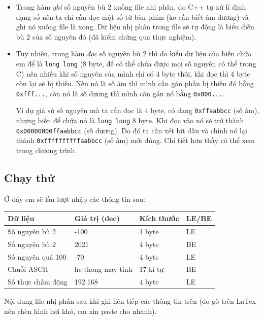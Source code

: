 \documentclass[12pt, final]{article}
\newcommand{\code}[1]{\texttt{#1}}
\begin{document}
\begin{itemize}
    \item Trong hàm \textit{ghi} số nguyên bù 2 xuống file nhị phân, do C++ tự xử lí định dạng số nên ta chỉ cần đọc một số từ bàn phím (ko cần biết âm dương) và ghi nó xuống file là xong. Dữ liệu nhị phân trong file sẽ tự động là biểu diễn bù 2 của số nguyên đó (đã kiểm chứng qua thực nghiệm).
    \item Tuy nhiên, trong hàm \textit{đọc} số nguyên bù 2 thì do kiểu dữ liệu của biến chứa em để là \code{long long} (8 byte, để có thể chứa được mọi số nguyên có thể trong C) nên nhiều khi số nguyên của mình chỉ có 4 byte thôi, khi đọc thì 4 byte còn lại sẽ bị thiếu. Nếu nó là số âm thì mình cần gán phần bị thiếu đó bằng \code{0xfff...}, còn nó là số dương thì mình cần gán nó bằng \code{0x000...}.\par 
    Ví dụ giả sử số nguyên mà ta cần đọc là 4 byte, có dạng \code{0xffaabbcc} (số âm), nhưng biến để chứa nó là \code{long long} 8 byte. Khi đọc vào nó sẽ trở thành \code{0x00000000ffaabbcc} (số dương). Do đó ta cần xét bit dấu và chỉnh nó lại thành \code{0xffffffffffaabbcc} (số âm) mới đúng. \newline Chi tiết hơn thầy có thể xem trong chương trình.
\end{itemize}

\subsection{Chạy thử}
Ở đây em sẽ lần lượt nhập các thông tin sau:

\begin{table}[H]
\centering
\begin{tabularx}{\textwidth}{| X | X | X | X |}
\hline
\textbf{Dữ liệu} & \textbf{Giá trị (dec)} & \textbf{Kích thước} & \textbf{LE/BE} \\
\hline
Số nguyên bù 2 & -100 & 1 byte & LE \\

Số nguyên bù 2 & 2021 & 4 byte & BE \\
Số nguyên quá 100 & -70 & 4 byte & LE \\
Chuỗi ASCII & he thong may tinh & 17 kí tự & BE \\
Số thực chấm động & 192.168 & 4 byte & LE \\
\hline
\end{tabularx}
\end{table}
Nội dung file nhị phân sau khi ghi liên tiếp các thông tin trên (do gõ trên LaTex nên chèn hình hơi khó, em xin paste cho nhanh).
\end{document}
